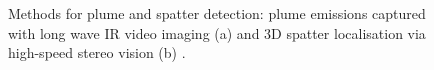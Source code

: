 \begin{figure}
    \centering
    \qquad
    \caption[Methods for plume and spatter detection.]{Methods for plume and spatter detection: plume emissions captured with long wave IR video imaging (a) \cite{grasso_statistical_2019} and 3D spatter localisation via high-speed stereo vision (b) \cite{barrett_statistical_2019}.}
\end{figure}
